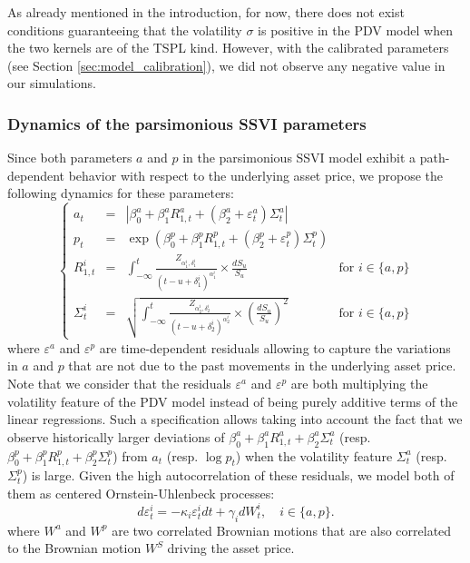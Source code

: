 \begin{remark}
    As already mentioned in the introduction, for now, there does not exist conditions guaranteeing that the volatility $\sigma$ is positive in the PDV model when the two kernels are of the TSPL kind. However, with the calibrated parameters (see Section \ref{sec:model_calibration}), we did not observe any negative value in our simulations. 
\end{remark}


\subsubsection{Dynamics of the parsimonious SSVI parameters}
Since both parameters $a$ and $p$ in the parsimonious SSVI model exhibit a path-dependent behavior with respect to the underlying asset price, we propose the following dynamics for these parameters:
\begin{equation}\label{eq:a_p_dynamics}
    \left\{ 
    \begin{array}{rcll}
        a_t &=& \left|\beta_0^a+\beta_1^aR_{1,t}^a+(\beta_2^a+\varepsilon_t^a)\Sigma_t^a \right| \\
        p_t &=& \exp\left(\beta_0^p+\beta_1^pR_{1,t}^p+(\beta_2^p+\varepsilon_t^p)\Sigma_t^p\right) \\
        R_{1,t}^{i} &=& \displaystyle\int_{-\infty}^t \frac{Z_{\alpha_1^i,\delta_1^i}}{(t-u+\delta_1^i)^{\alpha_1^i}}\times \frac{dS_u}{S_u} & \text{for } i \in \{a,p\}\\
        \Sigma_t^{i} &=& \sqrt{\displaystyle\int_{-\infty}^t \frac{Z_{\alpha_2^i,\delta_2^i}}{(t-u+\delta_2^i)^{\alpha_2^i}}\times\left(\frac{dS_u}{S_u}\right)^2} & \text{for } i \in \{a,p\}
    \end{array}
    \right.
\end{equation}
where $\varepsilon^a$ and $\varepsilon^p$ are time-dependent residuals allowing to capture the variations in $a$ and $p$ that are not due to the past movements in the underlying asset price. Note that we consider that the residuals $\varepsilon^a$ and $\varepsilon^p$ are both multiplying the volatility feature of the PDV model instead of being purely additive terms of the linear regressions. Such a specification allows taking into account the fact that we observe historically larger deviations
of $\beta_0^a+\beta_1^aR_{1,t}^a+\beta_2^a\Sigma_t^a$ (resp. $\beta_0^p+\beta_1^pR_{1,t}^p+\beta_2^p\Sigma_t^p$) from $a_t$ (resp. $\log p_t$) when the volatility feature $\Sigma_t^a$ (resp. $\Sigma_t^p$) is large. Given the high autocorrelation of these residuals, we model both of them as centered Ornstein-Uhlenbeck processes:
\begin{equation}\label{eq:ou_processes}
    d\varepsilon_t^i = -\kappa_i\varepsilon_t^i dt + \gamma_i dW_t^i, \quad i\in \{a,p\}. 
\end{equation}
where $W^a$ and $W^p$ are two correlated Brownian motions that are also correlated to the Brownian motion $W^S$ driving the asset price. 

